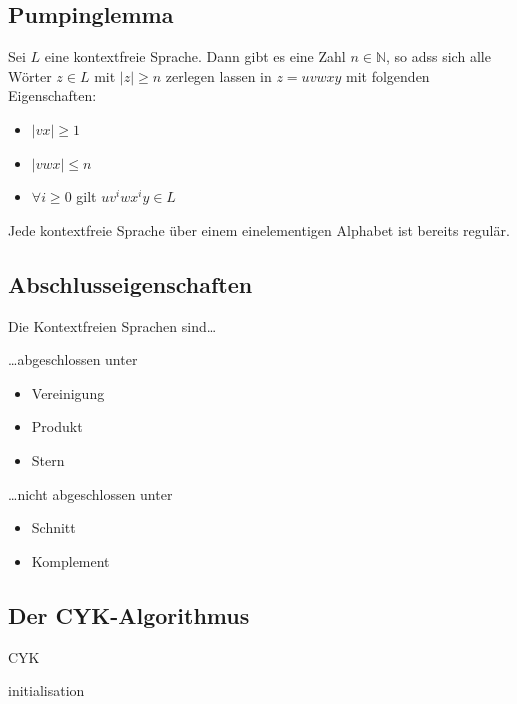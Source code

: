 \documentclass{scrartcl}
\begin{document}
\subsection*{Pumpinglemma}
\begin{shaded}
    Sei $L$ eine kontextfreie Sprache. Dann gibt es eine Zahl $n\in \mathds{N}$, so adss sich alle Wörter $z\in L$ mit $|z|\geq n$ zerlegen lassen in $z=uvwxy$ mit folgenden Eigenschaften:
    \begin{itemize}
        \item $|vx|\geq 1$
        \item $|vwx|\leq n$
        \item $\forall i\geq0$ gilt $uv^iwx^iy\in L$
    \end{itemize}
    Jede kontextfreie Sprache über einem einelementigen Alphabet ist bereits regulär.
\end{shaded}

\subsection*{Abschlusseigenschaften}
\begin{shaded}
Die Kontextfreien Sprachen sind\dots \\
\begin{minipage}[t]{0.48\textwidth}
\dots abgeschlossen unter
\begin{itemize}
    \item Vereinigung
    \item Produkt
    \item Stern
\end{itemize}
\end{minipage}
\hfill \vrule \hfill
\begin{minipage}[t]{0.48\textwidth}
\dots nicht abgeschlossen unter
\begin{itemize}
    \item Schnitt
    \item Komplement
\end{itemize}
\end{minipage}
\end{shaded}

\subsection*{Der CYK-Algorithmus}
\begin{algorithm}[H]
    \caption{CYK}
    \SetAlgoLined
    \LinesNumbered
    \PrintSemicolon
    initialisation\;
\end{algorithm}
\end{document}
